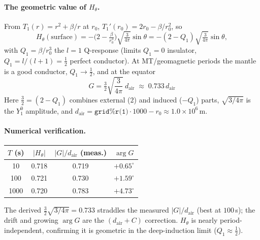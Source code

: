 \documentclass[11pt]{article}
\newcommand{\dair}{d_{\mathrm{air}}}
\begin{document}
\paragraph{The geometric value of $H_\theta$.} From $T_1(r)=r^2+\beta/r$ at $r_0$,
$T_1'(r_0)=2r_0-\beta/r_0^2$, so
\begin{equation}
H_\theta(\text{surface})=-\Big(2-\tfrac{\beta}{r_0^3}\Big)\sqrt{\tfrac{3}{4\pi}}\sin\theta
=-(2-Q_1)\sqrt{\tfrac{3}{4\pi}}\sin\theta,
\end{equation}
with $Q_1=\beta/r_0^3$ the $l=1$ Q-response (limits $Q_1=0$ insulator, $Q_1=l/(l+1)=\tfrac12$ perfect
conductor). At MT/geomagnetic periods the mantle is a good conductor, $Q_1\to\tfrac12$, and at the
equator
\begin{equation}
\boxed{\ G=\tfrac32\sqrt{\dfrac{3}{4\pi}}\ \dair\;\approx\;0.733\,\dair\ }
\end{equation}
Here $\tfrac32=(2-Q_1)$ combines external ($2$) and induced ($-Q_1$) parts, $\sqrt{3/4\pi}$ is the
$Y_1^0$ amplitude, and $\dair=\texttt{grid\%r(1)}\!\cdot\!1000-r_0\approx1.0\times10^{6}\,\mathrm{m}$.

\paragraph{Numerical verification.}
\begin{center}
\begin{tabular}{cccc}
\toprule
$T$ (s) & $|H_\theta|$ & $|G|/\dair$ (meas.) & $\arg G$\\
\midrule
10 & 0.718 & 0.719 & $+0.65^\circ$\\
100 & 0.721 & 0.730 & $+1.59^\circ$\\
1000 & 0.720 & 0.783 & $+4.73^\circ$\\
\bottomrule
\end{tabular}
\end{center}
The derived $\tfrac32\sqrt{3/4\pi}=0.733$ straddles the measured $|G|/\dair$ (best at $100\,$s); the
drift and growing $\arg G$ are the $(\dair+C)$ correction. $H_\theta$ is nearly period-independent,
confirming it is geometric in the deep-induction limit ($Q_1\approx\tfrac12$).
\end{document}
